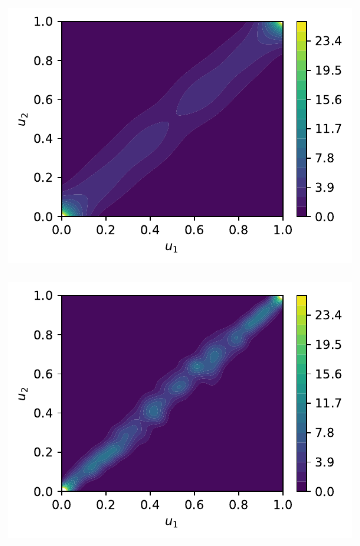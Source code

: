 \documentclass[../Thesis.tex]{subfiles}
\begin{document}
\begin{figure}[H]
    \centering
    \begin{subfigure}[t]{0.49\textwidth}
        \centering
        \includegraphics[width=\linewidth]{figures/MI estimation/regularized Jones - rho 0.99 - comparison of methods.pdf}
        \caption{}
    \end{subfigure}
    \hfill
    \begin{subfigure}[t]{0.49\textwidth}
        \centering
        \includegraphics[width=\linewidth]{figures/MI estimation/regularized Jones - rho 0.99 - comparison of methods - 0.3 hscott.pdf}
        \caption{}
    \end{subfigure}
    \\[\baselineskip]

\end{figure}
\end{document}
